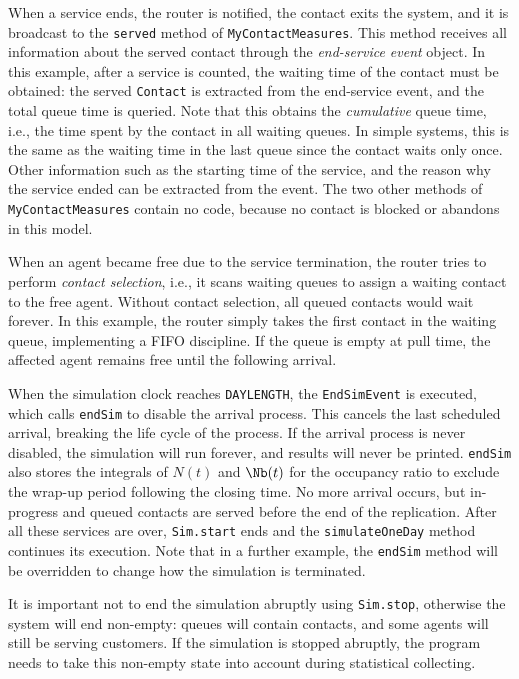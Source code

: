 When a service ends, the router is notified,
the contact exits the
system, and it is broadcast to the \texttt{served}
method of \texttt{My\-Contact\-Measures}.
This method receives all information about the served contact
through the \emph{end-service event} object.  In this example, after a
service is
counted, the waiting time of the contact must be obtained: the served
\texttt{Contact} is extracted from the end-service event, and the
total queue time is queried.  Note that this obtains the
\emph{cumulative} queue time, i.e., the time spent by the contact in
all waiting queues.  In simple systems, this is the same as the waiting
time in the last queue since the contact waits only once.
Other information such as the starting time of the service, and the
reason why the service ended can be extracted from the event.
The two other methods of \texttt{My\-Contact\-Measures} contain no
code, because no contact is blocked or abandons in this model.

When an agent became free due to the service termination, the
router tries to perform \emph{contact selection}, i.e., it
scans waiting queues to assign a waiting contact to the free agent.
Without contact selection, all queued contacts would wait forever.  In
this example, the router simply takes the first contact
in the waiting queue, implementing a FIFO discipline.  If the queue is
empty at pull time, the affected agent remains free until the
following arrival.

When the simulation clock reaches \texttt{DAYLENGTH}, the
\texttt{End\-Sim\-Event} is executed, which calls \texttt{end\-Sim} to
disable the arrival
process.  This cancels the last scheduled arrival, breaking the life
cycle of the process.
If the arrival process is never disabled, the simulation will run
forever, and results will never be printed.
\texttt{end\-Sim} also stores the integrals of $N(t)$ and $\Nb(t)$ for
the occupancy ratio to exclude the wrap-up period following the
closing time.  No more arrival occurs, but in-progress and queued
contacts are served before the end of the replication.  After all
these services are over, \texttt{Sim.start} ends and the
\texttt{simulate\-One\-Day} method continues its execution.
Note that in a further example, the \texttt{end\-Sim} method will be
overridden to change how the simulation is terminated.

It is important not to end the simulation abruptly using
\texttt{Sim.stop}, otherwise the system will end non-empty:
queues will contain contacts, and some
agents will still be serving customers.  If the simulation is stopped
abruptly, the program needs to take this non-empty state into account
during statistical collecting.


